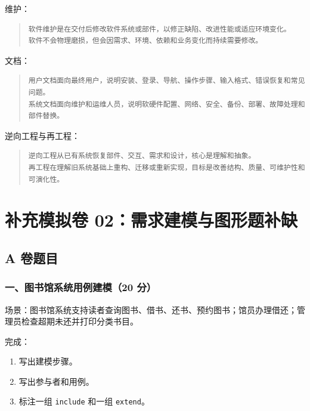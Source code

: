 \documentclass[UTF8,zihao=-4]{ctexart}
\begin{document}
维护：


\begin{quote}
\footnotesize
\begin{verbatim}
软件维护是在交付后修改软件系统或部件，以修正缺陷、改进性能或适应环境变化。
软件不会物理磨损，但会因需求、环境、依赖和业务变化而持续需要修改。
\end{verbatim}
\end{quote}


文档：


\begin{quote}
\footnotesize
\begin{verbatim}
用户文档面向最终用户，说明安装、登录、导航、操作步骤、输入格式、错误恢复和常见问题。
系统文档面向维护和运维人员，说明软硬件配置、网络、安全、备份、部署、故障处理和部件替换。
\end{verbatim}
\end{quote}


逆向工程与再工程：


\begin{quote}
\footnotesize
\begin{verbatim}
逆向工程从已有系统恢复部件、交互、需求和设计，核心是理解和抽象。
再工程在理解旧系统基础上重构、迁移或重新实现，目标是改善结构、质量、可维护性和可演化性。
\end{verbatim}
\end{quote}


\section{补充模拟卷 02：需求建模与图形题补缺}


\subsection{A 卷题目}


\subsubsection*{一、图书馆系统用例建模（20 分）}


场景：图书馆系统支持读者查询图书、借书、还书、预约图书；馆员办理借还；管理员检查超期未还并打印分类书目。


完成：


\begin{enumerate}
\item 写出建模步骤。
\item 写出参与者和用例。
\item 标注一组 \texttt{include} 和一组 \texttt{extend}。
\end{enumerate}
\end{document}
